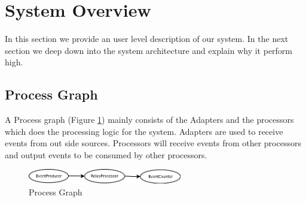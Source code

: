 \section{System Overview}
In this section we provide an user level description of our system. In the next section we deep down into the system architecture and explain why it perform high.
\subsection{Process Graph}
A Process graph (Figure \ref{processgraph}) mainly consists of the Adapters and the processors which does the processing logic for the system. Adapters are used to receive events from out side sources. Processors will receive events from other processors and output events to be consumed by other processors. 

\begin{figure}
        \centering
        \includegraphics[width=0.6\textwidth]{processgraph.png}
        \caption{Process Graph}
        \label{processgraph}
\end{figure}

\subsection{}